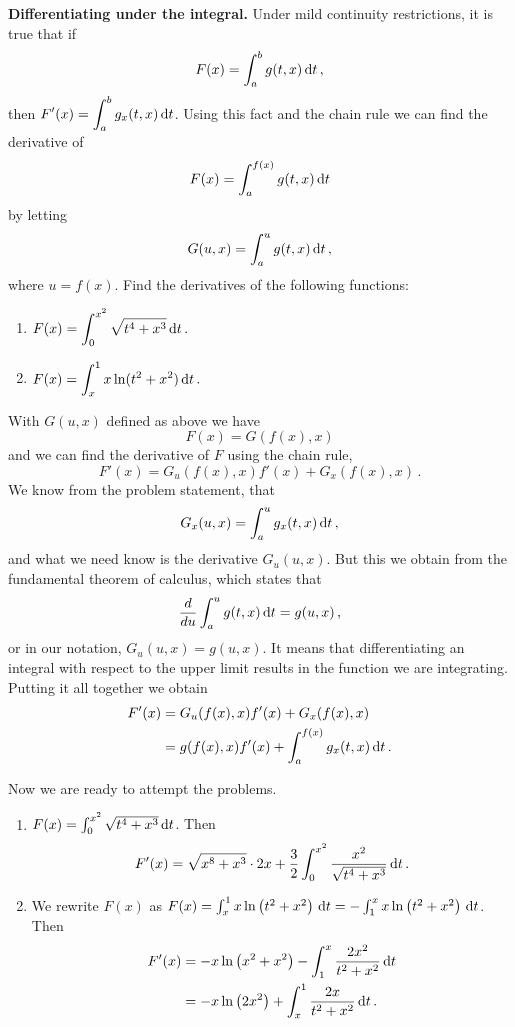 \begin{question}
{\bfseries Differentiating under the integral.}
Under mild continuity restrictions, it is true that if
\[
F(x) = \int_a^b g(t,x) \,\mathrm{d} t\,,
\]
then
$\displaystyle F'(x) = \int_a^b g_x(t,x) \,\mathrm{d} t$.
Using this fact and the chain rule we can find the derivative of
\[
F(x) = \int_a^{f(x)} g(t,x) \,\mathrm{d} t
\]
by letting
\[
G(u,x) = \int_a^u g(t,x) \,\mathrm{d} t\,,
\]
where $u = f(x)$. Find the derivatives of the following functions:
\begin{enumerate}
\item
$\displaystyle
F(x) = \int_0^{x^2} \sqrt{t^4 + x^3} \,\mathrm{d} t\,.
$
\item
$\displaystyle
F(x) = \int_{x}^{1} x \ln(t^2+x^2) \,\mathrm{d} t\,.
$
\end{enumerate}
\end{question}

\begin{solution}
With $G(u,x)$ defined as above we have
\[
F(x) = G(f(x), x)
\]
and we can find the derivative of $F$ using the chain rule,
\[
F'(x) = G_u(f(x),x) f'(x) + G_x(f(x),x)\,.
\]
We know from the problem statement, that
\[
G_x(u,x) = \int_a^u g_x(t,x) \,\mathrm{d} t\,,
\]
and what we need know is the derivative $G_u(u,x)$. But this we obtain from the fundamental theorem of calculus, which states that
\[
\frac{d}{du} \int_a^u g(t,x) \,\mathrm{d} t = g(u,x)\,,
\]
or in our notation, $G_u(u,x) = g(u,x)$. It means that differentiating an integral with respect to the upper limit results in the function we are integrating. Putting it all together we obtain
\begin{align*}
F'(x) &= G_u(f(x),x) f'(x) + G_x(f(x),x) \\
&= g(f(x), x) f'(x) + \int_a^{f(x)} g_x(t,x) \,\mathrm{d} t\,.
\end{align*}

Now we are ready to attempt the problems.
\begin{enumerate}
\item
$F(x) = \int_0^{x^2} \sqrt{t^4 + x^3} \,\mathrm{d} t$. Then
\[
F'(x) = \sqrt{x^8 + x^3} \cdot 2x + \frac 32 \int_0^{x^2} \frac{x^2}{\sqrt{t^4+x^3}} \,\mathrm{d} t\,.
\]
\item
We rewrite $F(x)$ as 
$F(x) = \int_{x}^{1} x \ln\left(t^2 + x^2\right) \,\mathrm{d} t = -\int_1^{x} x \ln\left(t^2 + x^2\right) \,\mathrm{d} t$. Then
\begin{align*}
F'(x) &= -x \ln \left(x^2 + x^2\right) - \int_1^x \frac{2x^2}{t^2 + x^2} \,\mathrm{d} t \\
&= -x \ln \left(2x^2 \right) + \int_x^1 \frac{2x}{t^2 + x^2} \,\mathrm{d} t\,.
\end{align*}
\end{enumerate}
\end{solution}

